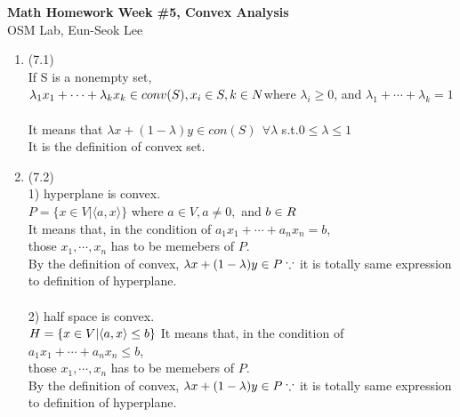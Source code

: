 \documentclass[letterpaper,12pt]{article}
\theoremstyle{definition}
\begin{document}
\begin{flushleft}
   \textbf{\large{Math Homework Week \#5, Convex Analysis}} \\[5pt]
   OSM Lab, Eun-Seok Lee \\[5pt]

\end{flushleft}

\vspace{5mm}

\begin{enumerate}



	\item (7.1) \\
If S is a nonempty set, \\$\lambda_1x_1 + \cdots + \lambda_kx_k \in conv(S), x_i\in S, k\in N\\
 $where $ \lambda_i \geq 0$, and $\lambda_1 + \cdots + \lambda_k =1 $ \\ \\
It means that $\lambda x+(1-\lambda)y \in con(S) \ \ \forall \lambda $ s.t.$ 0 \leq \lambda \leq 1 $ \\
It is the definition of convex set.


	\item (7.2) \\
1) hyperplane is convex. \\
$P = \{ x\in V | \langle a,x\rangle \}$ where $ a \in V, a \neq 0, $ and $ b \in R \\ $\\
It means that, in the condition of $a_1x_1 + \cdots + a_nx_n = b $, \\
those $x_1, \cdots,  x_n$ has to be memebers of $P$.
\\
By the definition of convex, $\lambda x + (1-\lambda)y \in P \\
\because$ it is totally same expression to definition of hyperplane. \\ \\

2) half space is convex. \\
$H = \{ x \in V | \langle a,x\rangle \leq b \} \\$
It means that, in the condition of $a_1x_1 + \cdots + a_nx_n \leq b $, \\
those $x_1, \cdots,  x_n$ has to be memebers of $P$.
\\
By the definition of convex, $\lambda x + (1-\lambda)y \in P \\
\because$ it is totally same expression to definition of hyperplane. \\ \\


\end{enumerate}
\end{document}
